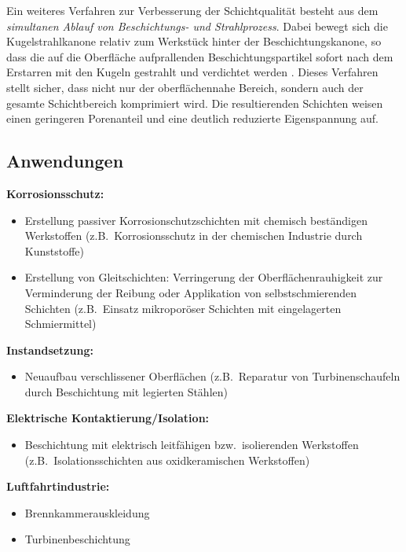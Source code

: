 \documentclass[12pt,a4paper,bibliography=totocnumbered,listof=totocnumbered,fleqn]{scrartcl}
\begin{document}
Ein weiteres Verfahren zur Verbesserung der Schichtqualität besteht aus dem \emph{simultanen Ablauf von Beschichtungs- und Strahlprozess}. Dabei bewegt sich die Kugelstrahlkanone relativ zum Werkstück hinter der Beschichtungskanone, so dass die auf die Oberfläche aufprallenden Beschichtungspartikel sofort nach dem Erstarren mit den Kugeln gestrahlt und verdichtet werden \citep{hofmann2010verfahren}. Dieses Verfahren stellt sicher, dass nicht nur der oberflächennahe Bereich, sondern auch der gesamte Schichtbereich komprimiert wird. Die resultierenden Schichten weisen einen geringeren Porenanteil und eine deutlich reduzierte Eigenspannung auf.    

\subsection{Anwendungen}

\textbf{Korrosionsschutz:}
\begin{itemize}
	\item Erstellung passiver Korrosionschutzschichten mit chemisch beständigen Werkstoffen (z.B.\ Korrosionsschutz in der chemischen Industrie durch Kunststoffe)
	\item Erstellung von Gleitschichten: Verringerung der Oberflächenrauhigkeit zur Verminderung der Reibung oder Applikation von selbstschmierenden Schichten (z.B.\ Einsatz mikroporöser Schichten mit eingelagerten Schmiermittel)
\end{itemize} 

\textbf{Instandsetzung:}
\begin{itemize}
	\item Neuaufbau verschlissener Oberflächen (z.B.\ Reparatur von Turbinenschaufeln durch Beschichtung mit legierten Stählen)
\end{itemize}

\textbf{Elektrische Kontaktierung/Isolation:}
\begin{itemize}
	\item Beschichtung mit elektrisch leitfähigen bzw.\ isolierenden Werkstoffen (z.B.\ Isolationsschichten aus oxidkeramischen Werkstoffen)
\end{itemize}

\textbf{Luftfahrtindustrie:}
\begin{itemize}
	\item Brennkammerauskleidung
	\item Turbinenbeschichtung
\end{itemize}
\end{document}
